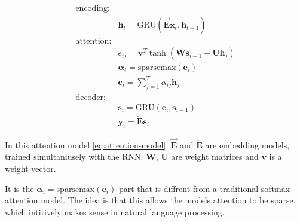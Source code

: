 \begin{equation}
\begin{aligned}
\text{encoding:} & \\
& \mathbf{h}_t = \mathrm{GRU}(\overrightarrow{\mathbf{E}} \mathbf{x}_t, \mathbf{h}_{t-1}) \\
\text{attention:} & \\
& e_{ij} = \mathbf{v}^T \tanh(\mathbf{W} \mathbf{s}_{i-1} + \mathbf{U} \mathbf{h}_j) \\
& {\boldsymbol\alpha}_i = \mathrm{sparsemax}(\mathbf{e}_i) \\
& \mathbf{c}_i = {\textstyle \sum_{j=1}^T} \alpha_{ij} \mathbf{h}_j \\
\text{decoder:} & \\
&\mathbf{s}_i = \mathrm{GRU}(\mathbf{c}_i, \mathbf{s}_{i-1}) \\
&\mathbf{y}_i = \overleftarrow{\mathbf{E}} \mathbf{s}_i
\end{aligned}
\label{eq:attention-model}
\end{equation}

In this attention model \eqref{eq:attention-model}, $\overrightarrow{\mathbf{E}}$ and $\overleftarrow{\mathbf{E}}$ are embedding models, trained simultaniusely with the RNN. $\mathbf{W}$, $\mathbf{U}$ are weight matrices and $\mathbf{v}$ is a weight vector.

It is the ${\boldsymbol\alpha}_i = \mathrm{sparsemax}(\mathbf{e}_i)$ part that is diffrent from a traditional softmax attention model. The idea is that this allows the models attention to be sparse, which intitively makes sense in natural language processing.